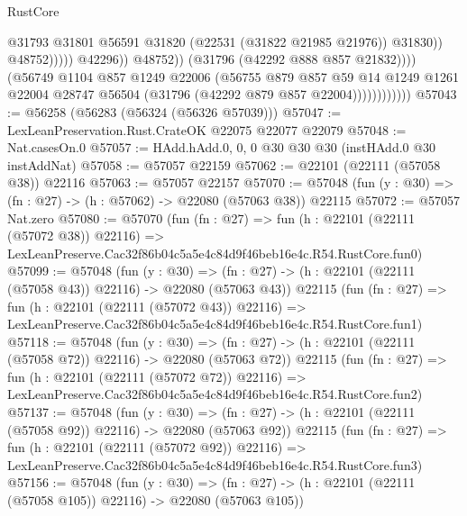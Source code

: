 \begin{lexlean}{RustCore}
\begin{coremodule}
                                              @31793
                                              @31801
                                              @56591
                                              @31820
                                              (@22531 (@31822 @21985 @21976))
                                              @31830))
                                          @48752)))))
                                @42296))
                            @48752))
                        (@31796 (@42292 @888 @857 @21832))))
                    (@56749
                      @1104
                      @857
                      @1249
                      @22006
                      (@56755
                        @879
                        @857
                        @59
                        @14
                        @1249
                        @1261
                        @22004
                        @28747
                        @56504
                        (@31796 (@42292 @879 @857 @22004))))))))))))
@57043 := @56258 (@56283 (@56324 (@56326 @57039)))
@57047 := LexLeanPreservation.Rust.CrateOK @22075 @22077 @22079
@57048 := Nat.casesOn.{0}
@57057 := HAdd.hAdd.{0, 0, 0} @30 @30 @30 (instHAdd.{0} @30 instAddNat)
@57058 := @57057 @22159
@57062 := @22101 (@22111 (@57058 @38)) @22116
@57063 := @57057 @22157
@57070 := @57048 (fun (y : @30) => (fn : @27) -> (h : @57062) -> @22080 (@57063 @38)) @22115
@57072 := @57057 Nat.zero
@57080 := @57070
    (fun (fn : @27) =>
    fun (h : @22101 (@22111 (@57072 @38)) @22116) =>
    LexLeanPreserve.Cac32f86b04c5a5e4c84d9f46beb16e4c.R54.RustCore.fun0)
@57099 := @57048
    (fun (y : @30) =>
    (fn : @27) -> (h : @22101 (@22111 (@57058 @43)) @22116) -> @22080 (@57063 @43))
    @22115
    (fun (fn : @27) =>
    fun (h : @22101 (@22111 (@57072 @43)) @22116) =>
    LexLeanPreserve.Cac32f86b04c5a5e4c84d9f46beb16e4c.R54.RustCore.fun1)
@57118 := @57048
    (fun (y : @30) =>
    (fn : @27) -> (h : @22101 (@22111 (@57058 @72)) @22116) -> @22080 (@57063 @72))
    @22115
    (fun (fn : @27) =>
    fun (h : @22101 (@22111 (@57072 @72)) @22116) =>
    LexLeanPreserve.Cac32f86b04c5a5e4c84d9f46beb16e4c.R54.RustCore.fun2)
@57137 := @57048
    (fun (y : @30) =>
    (fn : @27) -> (h : @22101 (@22111 (@57058 @92)) @22116) -> @22080 (@57063 @92))
    @22115
    (fun (fn : @27) =>
    fun (h : @22101 (@22111 (@57072 @92)) @22116) =>
    LexLeanPreserve.Cac32f86b04c5a5e4c84d9f46beb16e4c.R54.RustCore.fun3)
@57156 := @57048
    (fun (y : @30) =>
    (fn : @27) -> (h : @22101 (@22111 (@57058 @105)) @22116) -> @22080 (@57063 @105))

\end{coremodule}
\end{lexlean}
